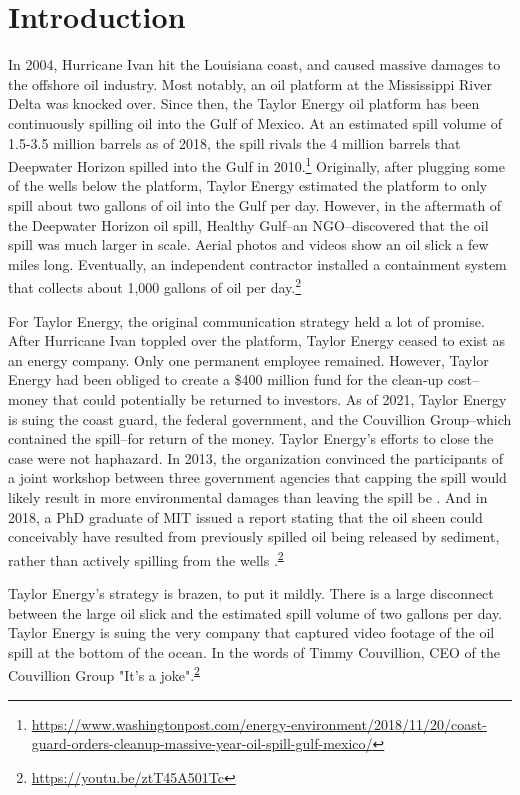 
\section*{Introduction}\label{sec:intro}

In 2004, Hurricane Ivan hit the Louisiana coast, and caused massive damages to the offshore oil industry. Most notably, an oil platform at the Mississippi River Delta was knocked over. Since then, the Taylor Energy oil platform has been continuously spilling oil into the Gulf of Mexico. At an estimated spill volume of 1.5-3.5 million barrels as of 2018, the spill rivals the 4 million barrels that Deepwater Horizon spilled into the Gulf in 2010.\footnote{\url{https://www.washingtonpost.com/energy-environment/2018/11/20/coast-guard-orders-cleanup-massive-year-oil-spill-gulf-mexico/}} Originally, after plugging some of the wells below the platform, Taylor Energy estimated the platform to only spill about two gallons of oil into the Gulf per day. However, in the aftermath of the Deepwater Horizon oil spill, Healthy Gulf--an NGO--discovered that the oil spill was much larger in scale. Aerial photos and videos show an oil slick a few miles long. Eventually, an independent contractor installed a containment system that collects about 1,000 gallons of oil per day.\footnote{\url{https://youtu.be/ztT45A501Tc}\label{foot:vice}}

For Taylor Energy, the original communication strategy held a lot of promise. After Hurricane Ivan toppled over the platform, Taylor Energy ceased to exist as an energy company. Only one permanent employee remained. However, Taylor Energy had been obliged to create a \$400 million fund for the clean-up cost--money that could potentially be returned to investors. As of 2021, Taylor Energy is suing the coast guard, the federal government, and the Couvillion Group--which contained the spill--for return of the money. Taylor Energy's efforts to close the case were not haphazard. In 2013, the organization convinced the participants of a joint workshop between three government agencies that capping the spill would likely result in more environmental damages than leaving the spill be \citep{Staves2013}. And in 2018, a PhD graduate of MIT issued a report stating that the oil sheen could conceivably have resulted from previously spilled oil being released by sediment, rather than actively spilling from the wells \citep{Camilli2018}.\textsuperscript{\ref{foot:vice}}

Taylor Energy's strategy is brazen, to put it mildly. There is a large disconnect between the large oil slick and the estimated spill volume of two gallons per day. Taylor Energy is suing the very company that captured video footage of the oil spill at the bottom of the ocean. In the words of Timmy Couvillion, CEO of the Couvillion Group "It's a joke".\textsuperscript{\ref{foot:vice}}

